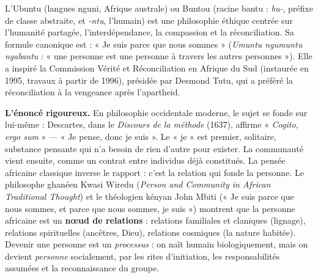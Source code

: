 \documentclass[11pt]{article}
\newcommand{\cle}[1]{{\popxbold\color{popdark}#1}}
\begin{document}
\begin{definition}
L'\cle{Ubuntu} (langues nguni, Afrique australe) ou \cle{Buntou} (racine bantu : \emph{bu-}, préfixe de classe abstraite, et \emph{-ntu}, l'humain) est une philosophie éthique centrée sur l'\cle{humanité partagée}, l'\cle{interdépendance}, la \cle{compassion} et la \cle{réconciliation}. Sa formule canonique est : « Je suis parce que nous sommes » (\emph{Umuntu ngumuntu ngabantu} : « une personne est une personne à travers les autres personnes »). Elle a inspiré la Commission Vérité et Réconciliation en Afrique du Sud (instaurée en 1995, travaux à partir de 1996), présidée par Desmond Tutu, qui a préféré la réconciliation à la vengeance après l'apartheid.
\end{definition}

\textbf{L'énoncé rigoureux.} En philosophie occidentale moderne, le sujet se fonde sur lui-même : Descartes, dans le \emph{Discours de la méthode} (1637), affirme « \emph{Cogito, ergo sum} » — « Je pense, donc je suis ». Le « je » est premier, solitaire, substance pensante qui n'a besoin de rien d'autre pour exister. La communauté vient ensuite, comme un contrat entre individus déjà constitués. La pensée africaine classique inverse le rapport : c'est la relation qui fonde la personne. Le philosophe ghanéen Kwasi \cle{Wiredu} (\emph{Person and Community in African Traditional Thought}) et le théologien kényan John \cle{Mbiti} (« Je suis parce que nous sommes, et parce que nous sommes, je suis ») montrent que la \cle{personne} africaine est un \textbf{nœud de relations} : relations familiales et claniques (lignage), relations spirituelles (ancêtres, Dieu), relations cosmiques (la nature habitée). Devenir une personne est un \emph{processus} : on naît humain biologiquement, mais on devient \emph{personne} socialement, par les rites d'initiation, les responsabilités assumées et la reconnaissance du groupe.
\end{document}

